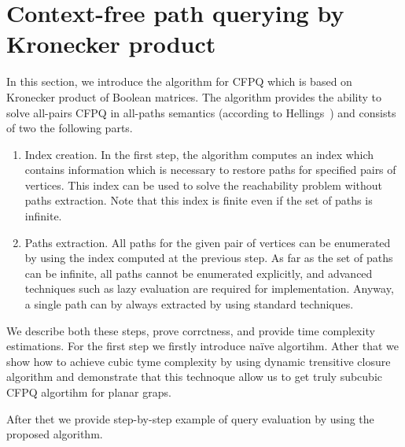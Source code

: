 \section{Context-free path querying by Kronecker product}


In this section, we introduce the algorithm for CFPQ which is based on Kronecker product of Boolean matrices. 
The algorithm provides the ability to solve all-pairs CFPQ in all-paths semantics (according to Hellings~\cite{!!!}) and consists of two the following parts. 
\begin{enumerate}
\item Index creation. In the first step, the algorithm computes an index which contains information which is necessary to restore paths for specified pairs of vertices. This index can be used to solve the reachability problem without paths extraction. Note that this index is finite even if the set of paths is infinite.
\item Paths extraction. All paths for the given pair of vertices can be enumerated by using the index computed at the previous step. As far as the set of paths can be infinite, all paths cannot be enumerated explicitly, and advanced techniques such as lazy evaluation are required for implementation. Anyway, a single path can by always extracted by using standard techniques.
\end{enumerate}

We describe both these steps, prove corrctness, and provide time complexity estimations. 
For the first step we firstly introduce na{\"i}ve algortihm. Ather that we show how to achieve cubic tyme complexity by using dynamic trensitive closure algorithm and demonstrate that this technoque allow us to get truly subcubic CFPQ algortihm for planar graps.

After thet we provide step-by-step example of query evaluation by using the proposed algorithm.




